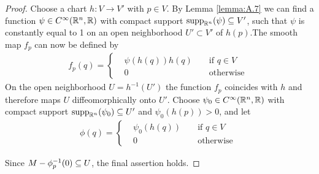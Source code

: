 \begin{proof}
  Choose a chart $h: V\to V'$ with $p\in V$. By Lemma \ref{lemma:A.7} we can find a
function $\psi\in C^\infty({\mathbb{R}}^n, {\mathbb{R}})$ with compact support $\mathrm{supp}_{{\mathbb{R}}^n}(\psi)\subseteq V'$, 
such that $\psi$ is constantly equal to 1 on an open neighborhood $U'\subset V'$ of $h(p)$.The 
smooth map $f_p$ can now be defined by
\begin{align*}
  f_p(q) = \left\{\begin{aligned}
    & \psi(h(q))h(q) && \text{ if } q\in V \\
    & 0 && \text{ otherwise }
  \end{aligned}\right.
\end{align*}
On the open neighborhood $U = h^{-1}(U')$ the function $f_p$ coincides with $h$ and
therefore maps $U$ diffeomorphically onto $U'$. Choose $\psi_0\in C^\infty({\mathbb{R}}^n, {\mathbb{R}})$ with
compact support $\mathrm{supp}_{{\mathbb{R}}^n}(\psi_0)\subseteq U'$ and $\psi_0(h(p))>0$, and let
\begin{align*}
  \phi(q) = \left\{\begin{aligned}
    & \psi_0(h(q)) && \text{ if } q\in V \\
    & 0 && \text{ otherwise }
  \end{aligned}\right.
\end{align*}

Since $M-\phi_p^{-1}(0)\subseteq U$, the final assertion holds.
\end{proof}

